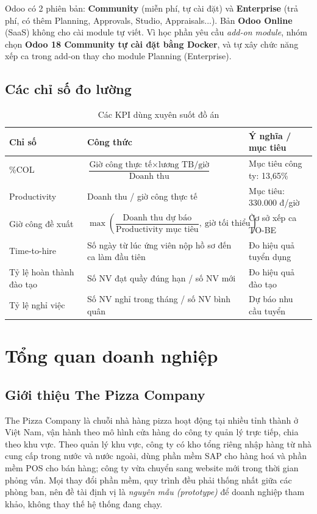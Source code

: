 \documentclass[12pt,a4paper,oneside]{report}
\begin{document}
Odoo có 2 phiên bản: \textbf{Community} (miễn phí, tự cài đặt) và \textbf{Enterprise} (trả phí, có thêm Planning, Approvals, Studio, Appraisals...). Bản \textbf{Odoo Online} (SaaS) không cho cài module tự viết. Vì học phần yêu cầu \emph{add-on module}, nhóm chọn \textbf{Odoo 18 Community tự cài đặt bằng Docker}, và tự xây chức năng xếp ca trong add-on thay cho module Planning (Enterprise).

\section{Các chỉ số đo lường}
\begin{table}[H]\centering\small
\caption{Các KPI dùng xuyên suốt đồ án}\label{tab:kpi}
\begin{tabularx}{\linewidth}{L{2.4cm}L{6.4cm}Y}
\toprule \textbf{Chỉ số} & \textbf{Công thức} & \textbf{Ý nghĩa / mục tiêu} \\\midrule
\%COL & $\dfrac{\text{Giờ công thực tế}\times\text{lương TB/giờ}}{\text{Doanh thu}}$ & Mục tiêu công ty: 13,65\% \\
Productivity & Doanh thu / giờ công thực tế & Mục tiêu: 330.000 đ/giờ \\
Giờ công đề xuất & $\max\left(\dfrac{\text{Doanh thu dự báo}}{\text{Productivity mục tiêu}},\ \text{giờ tối thiểu}\right)$ & Cơ sở xếp ca TO-BE \\
Time-to-hire & Số ngày từ lúc ứng viên nộp hồ sơ đến ca làm đầu tiên & Đo hiệu quả tuyển dụng \\
Tỷ lệ hoàn thành đào tạo & Số NV đạt quầy đúng hạn / số NV mới & Đo hiệu quả đào tạo \\
Tỷ lệ nghỉ việc & Số NV nghỉ trong tháng / số NV bình quân & Dự báo nhu cầu tuyển \\
\bottomrule
\end{tabularx}
\end{table}

\chapter{Tổng quan doanh nghiệp}

\section{Giới thiệu The Pizza Company}
The Pizza Company là chuỗi nhà hàng pizza hoạt động tại nhiều tỉnh thành ở Việt Nam, vận hành theo mô hình cửa hàng do công ty quản lý trực tiếp, chia theo khu vực. Theo quản lý khu vực, công ty có kho tổng riêng nhập hàng từ nhà cung cấp trong nước và nước ngoài, dùng phần mềm SAP cho hàng hoá và phần mềm POS cho bán hàng; công ty vừa chuyển sang website mới trong thời gian phỏng vấn. Mọi thay đổi phần mềm, quy trình đều phải thống nhất giữa các phòng ban, nên đề tài định vị là \emph{nguyên mẫu (prototype)} để doanh nghiệp tham khảo, không thay thế hệ thống đang chạy.
\end{document}

